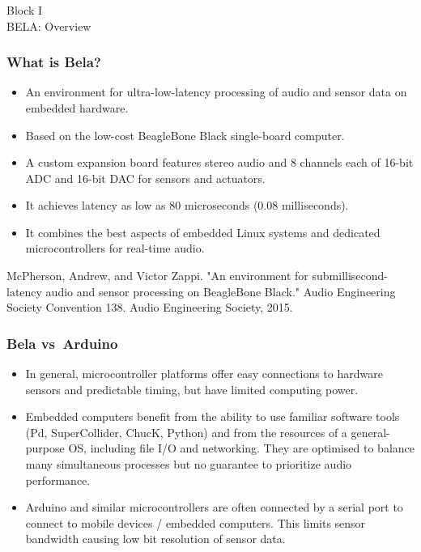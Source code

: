 \documentclass[screen, aspectratio=169]{beamer}
\begin{document}
%
\usebackgroundtemplate{}
\begin{frame}
\frametitle{}
{\huge Block I\\BELA: Overview }
\end{frame}
%
\begin{frame}
  \frametitle{What is Bela?}
\begin{itemize}
\item An environment for ultra-low-latency processing of audio and sensor data on embedded hardware.
\item Based on the low-cost BeagleBone Black single-board computer.
\item A custom expansion board features stereo audio and 8 channels each of 16-bit ADC and 16-bit DAC for sensors and actuators.
\item It achieves latency as low as 80 microseconds (0.08 milliseconds).
\item It combines the best aspects of embedded Linux systems and dedicated microcontrollers for real-time audio.
\end{itemize}
{\tiny
McPherson, Andrew, and Victor Zappi. "An environment for submillisecond-latency audio and sensor processing on BeagleBone Black." Audio Engineering Society Convention 138. Audio Engineering Society, 2015. \cite{Mcpherson.Zappi.2015.bela}
}
\end{frame}
%
\begin{frame}
  \frametitle{Bela vs\ Arduino}
\begin{itemize}
\item In general, microcontroller platforms offer easy connections to hardware sensors and predictable timing, but have limited computing power.
\item Embedded computers benefit from the ability to use familiar software tools (Pd, SuperCollider, ChucK, Python) and from the resources of a general-purpose OS, including file I/O and networking. They are optimised to balance many simultaneous processes but no guarantee to prioritize audio performance.
\item Arduino and similar microcontrollers are often connected by a serial port to connect to mobile devices / embedded computers. This limits sensor bandwidth causing low bit resolution of sensor data.
\end{itemize}
\end{frame}
%
\end{document}
